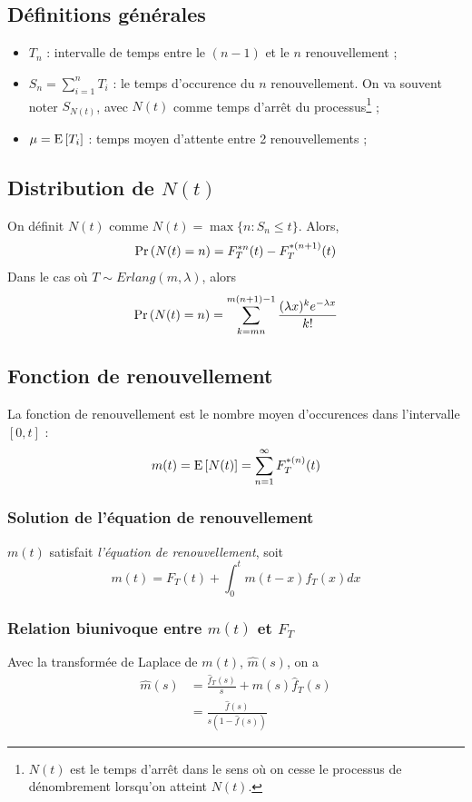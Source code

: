 \documentclass[10pt, french, landscape]{article}
\begin{document}
\begin{multicols*}{3}
\subsection*{Définitions générales}
\begin{itemize}
\item $T_n$ : intervalle de temps entre le $(n-1)$ et le $n$ renouvellement ;
\item $S_n = \sum_{i=1}^{n} T_i$ : le temps d'occurence du $n$ renouvellement. On va souvent noter $S_{N(t)}$, avec $N(t)$ comme temps d'arrêt du processus\footnote{$N(t)$ est le temps d'arrêt dans le sens où on cesse le processus de dénombrement lorsqu'on atteint $N(t)$.} ;

\item $\mu = \mathrm{E} \left[ T_i \right]$ : temps moyen d'attente entre 2 renouvellements ;
\end{itemize}

\subsection*{Distribution de $N(t)$}
On définit $N(t)$ comme $N(t) = \max \{ n : S_n \leq t \}$. Alors,
\begin{align*}
\Pr \left( N(t) = n \right) = F_T^{\ast n}(t) - F_T^{\ast(n+1)}(t)
\end{align*}
Dans le cas où $T \sim Erlang(m, \lambda)$, alors
\[\Pr \left( N(t) = n \right)  = \sum_{k=mn}^{m(n+1) - 1} \frac{(\lambda x)^k e^{-\lambda x}}{k!} \]

\subsection*{Fonction de renouvellement}
La fonction de renouvellement est le nombre moyen d'occurences dans l'intervalle $[0,t]$  :
\[m(t) = \mathrm{E} \left[ N(t) \right] = \sum_{n=1}^{\infty} F_T^{\ast(n)}(t)  \]

\subsubsection*{Solution de l'équation de renouvellement}
$m(t)$ satisfait \emph{l'équation de renouvellement}, soit
\[m(t) = F_T(t) + \int_{0}^{t} m(t-x) f_T(x) dx  \]

\subsubsection*{Relation biunivoque entre $m(t)$ et $F_T$}
Avec la transformée de Laplace de $m(t)$, $\hat{m}(s)$, on a
\begin{align*}
\hat{m}(s) &  = \frac{\hat{f}_T(s)}{s} + \hat{m}(s) \hat{f}_T(s) \\
& = \frac{\hat{f}(s)}{s\left(1 - \hat{f}(s)    \right)}
\end{align*}



\end{multicols*}
\end{document}
